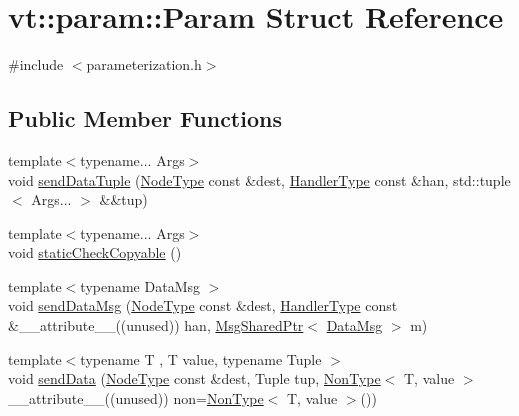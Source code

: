 \hypertarget{structvt_1_1param_1_1_param}{}\section{vt\+:\+:param\+:\+:Param Struct Reference}
\label{structvt_1_1param_1_1_param}


{\ttfamily \#include $<$parameterization.\+h$>$}

\subsection*{Public Member Functions}
\begin{DoxyCompactItemize}
\item 
{\footnotesize template$<$typename... Args$>$ }\\void \hyperlink{structvt_1_1param_1_1_param_ac12a098c0d64dcd483cdb590874e45ca}{send\+Data\+Tuple} (\hyperlink{namespacevt_a866da9d0efc19c0a1ce79e9e492f47e2}{Node\+Type} const \&dest, \hyperlink{namespacevt_af64846b57dfcaf104da3ef6967917573}{Handler\+Type} const \&han, std\+::tuple$<$ Args... $>$ \&\&tup)
\item 
{\footnotesize template$<$typename... Args$>$ }\\void \hyperlink{structvt_1_1param_1_1_param_a8d670f74eb5f0a1b5ea312e8b174b648}{static\+Check\+Copyable} ()
\item 
{\footnotesize template$<$typename Data\+Msg $>$ }\\void \hyperlink{structvt_1_1param_1_1_param_acad0af6824812d028e5e0f088b4757dd}{send\+Data\+Msg} (\hyperlink{namespacevt_a866da9d0efc19c0a1ce79e9e492f47e2}{Node\+Type} const \&dest, \hyperlink{namespacevt_af64846b57dfcaf104da3ef6967917573}{Handler\+Type} const \&\+\_\+\+\_\+attribute\+\_\+\+\_\+((unused)) han, \hyperlink{namespacevt_ab2b3d506ec8e8d1540aede826d84a239}{Msg\+Shared\+Ptr}$<$ \hyperlink{structvt_1_1param_1_1_data_msg}{Data\+Msg} $>$ m)
\item 
{\footnotesize template$<$typename T , T value, typename Tuple $>$ }\\void \hyperlink{structvt_1_1param_1_1_param_a6b2fedacd76ee622efdb14038b0d82fe}{send\+Data} (\hyperlink{namespacevt_a866da9d0efc19c0a1ce79e9e492f47e2}{Node\+Type} const \&dest, Tuple tup, \hyperlink{structvt_1_1param_1_1_non_type}{Non\+Type}$<$ T, value $>$ \+\_\+\+\_\+attribute\+\_\+\+\_\+((unused)) non=\hyperlink{structvt_1_1param_1_1_non_type}{Non\+Type}$<$ T, value $>$())
\item 

\end{DoxyCompactItemize}
